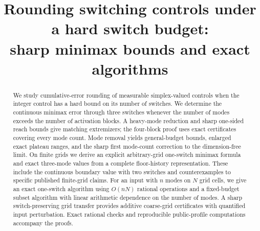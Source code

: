 \documentclass[11pt]{article}
\title{Rounding switching controls under a hard switch budget:\\sharp minimax bounds and exact algorithms}
\author{}
\date{}
\begin{document}
\maketitle
\begin{abstract}
We study cumulative-error rounding of measurable simplex-valued controls when
the integer control has a hard bound on its number of switches. We determine
the continuous minimax error through three switches whenever the number of
modes exceeds the number of activation blocks. A heavy-mode reduction and
sharp one-sided reach bounds give matching extremizers; the four-block proof
uses exact certificates covering every mode count. Mode removal yields
general-budget bounds, enlarged exact plateau ranges, and the sharp first
mode-count correction to the dimension-free limit. On finite grids we derive
an explicit arbitrary-grid one-switch minimax formula and exact three-mode
values from a complete floor-history representation. These include the
continuous boundary value with two switches and counterexamples to specific
published finite-grid claims. For an input with $n$ modes on $N$ grid cells,
we give an exact one-switch algorithm using $O(nN)$ rational operations
and a fixed-budget subset algorithm with linear arithmetic
dependence on the number of modes. A sharp switch-preserving grid transfer
provides additive coarse-grid certificates with quantified input perturbation.
Exact rational checks and reproducible public-profile computations accompany
the proofs.
\end{abstract}














\appendix



\end{document}
